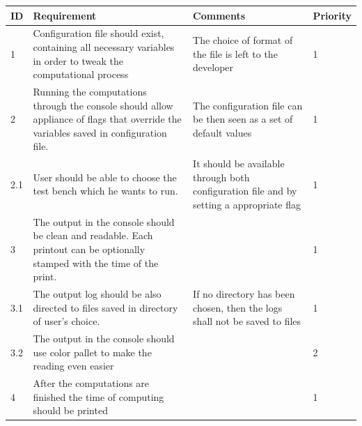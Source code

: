 \documentclass{article}
\begin{document}
\begin{center}
\hspace*{-2.1cm}
	\begin{longtable}{| l | p{4cm} | p{3.5cm} | l |}
	
		\hline
	  	ID & Requirement & Comments & Priority \\
		\hline
		
		1 & 
		
		Configuration file should exist, containing all necessary variables in order to tweak the computational process & 
		
		The choice of format of the file is left to the developer &
		 
		1 
		
		\\ \hline
				
		2 & 
		
		Running the computations through the console should allow appliance of flags that override the variables saved in configuration file. & 
		
		The configuration file can be then seen as a set of default values &
		 
		1 
		\\ \hline
		
		2.1 & 
		
		User should be able to choose the test bench which he wants to run.& 
		
		It should be available through both configuration file and by setting a appropriate flag &
		 
		1 
		\\ \hline
		

		3 & 
		
		The output in the console should be clean and readable.
		Each printout can be optionally stamped with the time of the print.& 
		
		&
		 
		1
		\\ \hline
		
		
		3.1 & 
		
		The output log should be also directed to files saved in directory of user's choice.& 
		
		If no directory has been chosen, then the logs shall not be saved to files&
		 
		1
		\\ \hline
		
		
		3.2 & 
		
		The output in the console should use color pallet to make the reading even easier& 
		
		&
		 
		2
		\\ \hline
		

		4 & 
		
		After the computations are finished the time of computing should be printed& 
		
		&
		 
		1
		\\ \hline		
		
	\end{longtable}
\end{center}	
\end{document}
